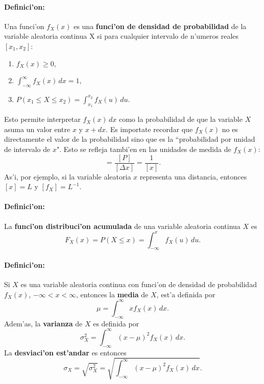 \paragraph{Definici'on:} Una funci'on $f_X(x)$ es una \textbf{funci'on de densidad de probabilidad} de la variable aleatoria continua X si para cualquier intervalo de n'umeros reales $[x_1,x_2]$:
\begin{enumerate}
\item $f_X(x)\geq 0$,
\item $\int_{-\infty}^\infty f_X(x)\,dx=1$,
\item $P(x_1\le X\le x_2)=\int_{x_1}^{x_2}f_X(u)\,du$.
\end{enumerate}

Esto permite interpretar $f_X(x)\,dx$ como la probabilidad de que la variable $X$ asuma un valor entre $x$ y $x+dx$. Es importate recordar que $f_X(x)$ no es directamente el valor de la probabilidad sino que es la ``probabilidad por unidad de intervalo de $x$". Esto se refleja tambi'en en las unidades de medida de $f_X(x)$:
\begin{equation}
[f_X]=\frac{[P]}{[\Delta x]}=\frac{1}{[x]}.
\end{equation}
As'i, por ejemplo, si la variable aleatoria $x$ representa una distancia, entonces $[x]=L$ y $[f_X]=L^{-1}$.


\paragraph{Definici'on:} La \textbf{funci'on distribuci'on acumulada} de una variable aleatoria continua $X$ es
\begin{equation}
F_X(x)=P(X\le x)=\int_{-\infty}^x f_X(u)\,du.
\end{equation}



\paragraph{Definici'on:} Si $X$ es una variable aleatoria continua con funci'on de densidad de probabilidad $f_X(x)$, $-\infty<x<\infty$, entonces la \textbf{media} de $X$, est'a definida por
\begin{equation}
\mu=\int_{-\infty}^\infty xf_X(x)\,dx.
\end{equation}
Adem'as, la \textbf{varianza} de $X$ es definida por 
\begin{equation}
\sigma_X^2=\int_{-\infty}^\infty (x-\mu)^2f_X(x)\,dx.
\end{equation}
La \textbf{desviaci'on est'andar} es entonces
\begin{equation}
\sigma_X=\sqrt{\sigma_X^2}=\sqrt{\int_{-\infty}^\infty (x-\mu)^2f_X(x)\,dx}.
\end{equation}


